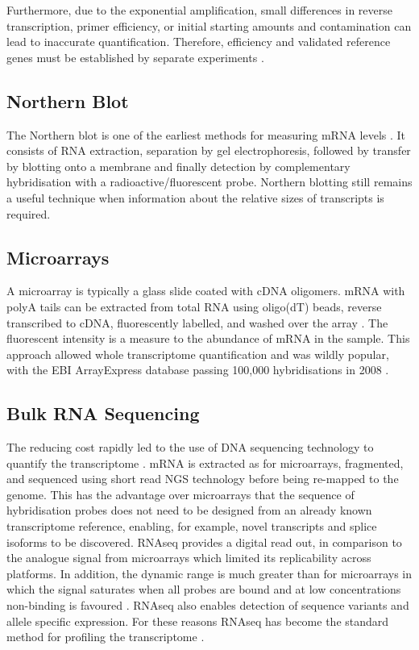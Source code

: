 Furthermore, due to the exponential amplification, small differences in reverse transcription, primer efficiency, or initial starting amounts and contamination can lead to inaccurate quantification.
Therefore, efficiency and validated reference genes must be established by separate experiments \parencite{Bustin2009MIQE}.

\subsection{Northern Blot}
The Northern blot is one of the earliest methods for measuring mRNA levels \parencite{Alwine1977Method}.
It consists of RNA extraction, separation by gel electrophoresis, followed by transfer by blotting onto a membrane and finally detection by complementary hybridisation with a radioactive/fluorescent probe.
Northern blotting still remains a useful technique when information about the relative sizes of transcripts is required.

\subsection{Microarrays}
A microarray is typically a glass slide coated with cDNA oligomers.
mRNA with polyA tails can be extracted from total RNA using oligo(dT) beads, reverse transcribed to cDNA, fluorescently labelled, and washed over the array \parencite{Schena1995Quantitative, DeRisi1996Use, Schulze2001Navigating}.
The fluorescent intensity is a measure to the abundance of mRNA in the sample.
This approach allowed whole transcriptome quantification and was wildly popular, with the EBI ArrayExpress database passing 100,000 hybridisations in 2008 \parencite{Rustici2008Data}.

\subsection{Bulk RNA Sequencing}
The reducing cost rapidly led to the use of DNA sequencing technology to quantify the transcriptome \parencite{Mortazavi2008Mapping, Cloonan2008Stem, Wilhelm2008Dynamic, Lister2008Highly, Nagalakshmi2008Transcriptional}.
mRNA is extracted as for microarrays, fragmented, and sequenced using short read NGS technology before being re-mapped to the genome.
This has the advantage over microarrays that the sequence of hybridisation probes does not need to be designed from an already known transcriptome reference, enabling, for example, novel transcripts and splice isoforms to be discovered.
RNAseq provides a digital read out, in comparison to the analogue signal from microarrays which limited its replicability across platforms.
In addition, the dynamic range is much greater than for microarrays in which the signal saturates when all probes are bound and at low concentrations non-binding is favoured \parencite{Zhao2014Comparison}.
RNAseq also enables detection of sequence variants and allele specific expression.
For these reasons RNAseq has become the standard method for profiling the transcriptome \parencite{Stark2019RNA}.

